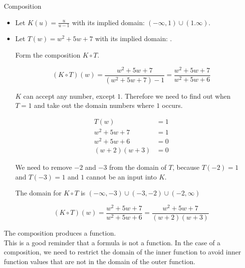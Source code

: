 \documentclass{ximera}
\begin{document}
\begin{example} Composition


\begin{itemize}
\item Let $K(u) = \frac{u}{u-1}$ with its implied domain: $(-\infty, 1) \cup (1. \infty)$. \\

\item Let $T(w) = w^2 + 5w + 7$ with its implied domain: \textbf{}.



Form the composition $K \circ T$.

\[        (K \circ T)(w) =     \frac{w^2 + 5w + 7}{(w^2 + 5w + 7)-1}   =    \frac{w^2 + 5w + 7}{w^2 + 5w + 6}  \]


$K$ can accept any number, except $1$.  Therefore we need to find out when $T = 1$ and take out the domain numbers where $1$ occurs.



\begin{align*}
T(w) & = 1   \\
w^2 + 5w + 7 & = 1 \\
w^2 + 5w + 6 & = 0   \\
(w+2)(w+3) & = 0
\end{align*}


We need to remove $-2$ and $-3$ from the domain of $T$, because $T(-2)=1$ and $T(-3)=1$ and $1$ cannot be an input into $K$.


The domain for $K \circ T$ is $(-\infty, -3) \cup (-3, -2) \cup (-2, \infty)$




\[        (K \circ T)(w)  =    \frac{w^2 + 5w + 7}{w^2 + 5w + 6}  =    \frac{w^2 + 5w + 7}{(w+2)(w+3)} \]





\end{itemize}




The composition produces a function. \\


This is a good reminder that a formula is not a function.  In the case of a composition, we need to restrict the domain of the inner function to avoid inner function values that are not in the domain of the outer function.










\end{example}
\end{document}
